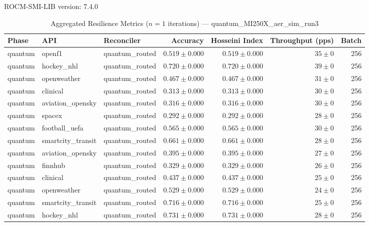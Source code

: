 ROCM-SMI-LIB version: 7.4.0

\begin{table}[htbp]
\caption{Aggregated Resilience Metrics ($n=1$ iterations) --- quantum_MI250X_aer_sim_run3}
\begin{tabular}{l l l r r r r}
\hline
Phase & API & Reconciler & Accuracy & Hosseini Index & Throughput (pps) & Batch \\
\hline
quantum & openf1 & quantum\_routed & $0.519\pm0.000$ & $0.519\pm0.000$ & $35\pm0$ & 256 \\
quantum & hockey\_nhl & quantum\_routed & $0.720\pm0.000$ & $0.720\pm0.000$ & $39\pm0$ & 256 \\
quantum & openweather & quantum\_routed & $0.467\pm0.000$ & $0.467\pm0.000$ & $31\pm0$ & 256 \\
quantum & clinical & quantum\_routed & $0.313\pm0.000$ & $0.313\pm0.000$ & $30\pm0$ & 256 \\
quantum & aviation\_opensky & quantum\_routed & $0.316\pm0.000$ & $0.316\pm0.000$ & $30\pm0$ & 256 \\
quantum & spacex & quantum\_routed & $0.292\pm0.000$ & $0.292\pm0.000$ & $28\pm0$ & 256 \\
quantum & football\_uefa & quantum\_routed & $0.565\pm0.000$ & $0.565\pm0.000$ & $30\pm0$ & 256 \\
quantum & smartcity\_transit & quantum\_routed & $0.661\pm0.000$ & $0.661\pm0.000$ & $28\pm0$ & 256 \\
quantum & aviation\_opensky & quantum\_routed & $0.395\pm0.000$ & $0.395\pm0.000$ & $27\pm0$ & 256 \\
quantum & finnhub & quantum\_routed & $0.329\pm0.000$ & $0.329\pm0.000$ & $26\pm0$ & 256 \\
quantum & clinical & quantum\_routed & $0.437\pm0.000$ & $0.437\pm0.000$ & $25\pm0$ & 256 \\
quantum & openweather & quantum\_routed & $0.529\pm0.000$ & $0.529\pm0.000$ & $24\pm0$ & 256 \\
quantum & smartcity\_transit & quantum\_routed & $0.716\pm0.000$ & $0.716\pm0.000$ & $25\pm0$ & 256 \\
quantum & hockey\_nhl & quantum\_routed & $0.731\pm0.000$ & $0.731\pm0.000$ & $28\pm0$ & 256 \\

\end{tabular}
\end{table}
